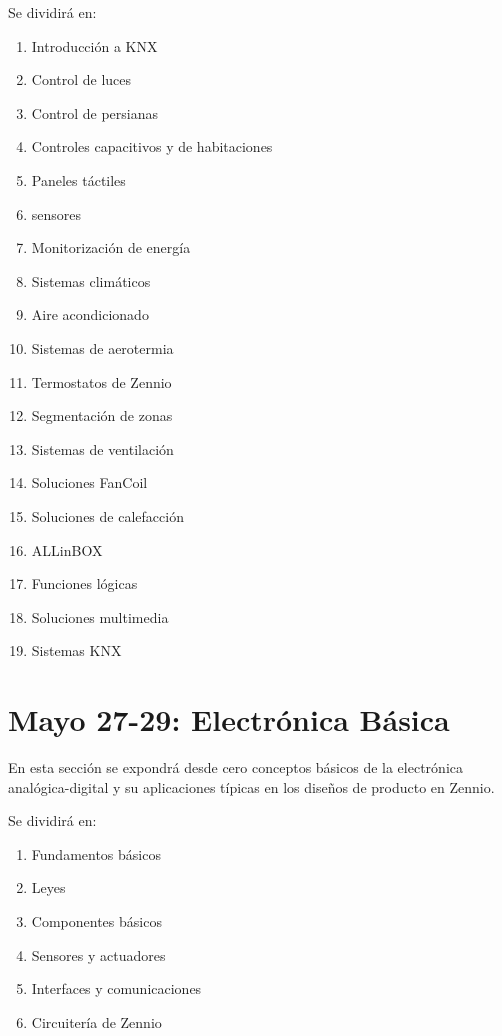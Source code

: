Se dividirá en:
\begin{enumerate}
    \item Introducción a KNX
    \item Control de luces
    \item Control de persianas
    \item Controles capacitivos y de habitaciones
    \item Paneles táctiles
    \item sensores
    \item Monitorización de energía
    \item Sistemas climáticos
    \item Aire acondicionado
    \item Sistemas de aerotermia
    \item Termostatos de Zennio
    \item Segmentación de zonas
    \item Sistemas de ventilación
    \item Soluciones FanCoil
    \item Soluciones de calefacción
    \item ALLinBOX
    \item Funciones lógicas
    \item Soluciones multimedia
    \item Sistemas KNX
\end{enumerate}

\section*{Mayo 27-29: Electrónica Básica}
\label{sec:may27-29}

En esta sección se expondrá desde cero conceptos básicos de la electrónica analógica-digital y su aplicaciones típicas en los diseños de producto en Zennio.

Se dividirá en:
 
\begin{enumerate}
    \item Fundamentos básicos
    \item Leyes
    \item Componentes básicos
    \item Sensores y actuadores
    \item Interfaces y comunicaciones
    \item Circuitería de Zennio
\end{enumerate}

